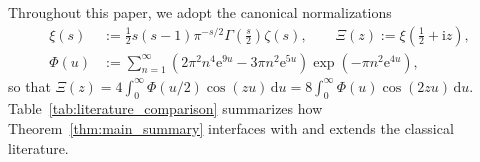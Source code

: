 \documentclass[11pt,reqno,a4paper]{amsart}
\theoremstyle{plain}
\theoremstyle{definition}
\theoremstyle{remark}
\numberwithin{equation}{section}
\newcommand{\dd}{\mathrm{d}}
\newcommand{\ii}{\mathrm{i}}
\newcommand{\ee}{\mathrm{e}}
\begin{document}
Throughout this paper, we adopt the canonical normalizations \cite{Titchmarsh1986}
\begin{equation}\label{eq:canonical_constants}
\begin{aligned}
  \xi(s) &:= \frac{1}{2}s(s-1)\pi^{-s/2}\Gamma\left(\frac{s}{2}\right)\zeta(s), \qquad
  \Xi(z) := \xi\left(\frac{1}{2} + \ii z\right), \\
  \Phi(u) &:= \sum_{n=1}^{\infty}\left(2\pi^2 n^4 \ee^{9u} - 3\pi n^2 \ee^{5u}\right)\exp\left(-\pi n^2 \ee^{4u}\right),
\end{aligned}
\end{equation}
so that $\Xi(z) = 4\int_0^\infty \Phi(u/2)\cos(zu)\,\dd u = 8\int_0^\infty \Phi(u)\cos(2zu)\,\dd u$. Table~\ref{tab:literature_comparison} summarizes how Theorem~\ref{thm:main_summary} interfaces with and extends the classical literature.
\end{document}
